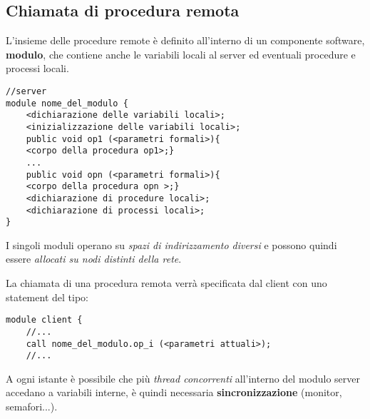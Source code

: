 \subsection{Chiamata di procedura remota}

L'insieme delle procedure remote è definito all'interno di un componente software, \textbf{modulo}, che contiene anche le variabili locali al server ed eventuali procedure e processi locali.

\begin{verbatim}
//server
module nome_del_modulo {
    <dichiarazione delle variabili locali>;
    <inizializzazione delle variabili locali>;
    public void op1 (<parametri formali>){
    <corpo della procedura op1>;}
    ...
    public void opn (<parametri formali>){
    <corpo della procedura opn >;}
    <dichiarazione di procedure locali>;
    <dichiarazione di processi locali>;
}
\end{verbatim}

I singoli moduli operano su \textit{spazi di indirizzamento diversi} e possono quindi essere \textit{allocati su nodi distinti della rete}.

La chiamata di una procedura remota verrà specificata dal client con uno statement del tipo:

\begin{verbatim}
module client {
    //...
    call nome_del_modulo.op_i (<parametri attuali>);
    //...
\end{verbatim}

A ogni istante è possibile che più \textit{thread concorrenti} all'interno del modulo server accedano a variabili interne, è quindi necessaria \textbf{sincronizzazione} (monitor, semafori...).

